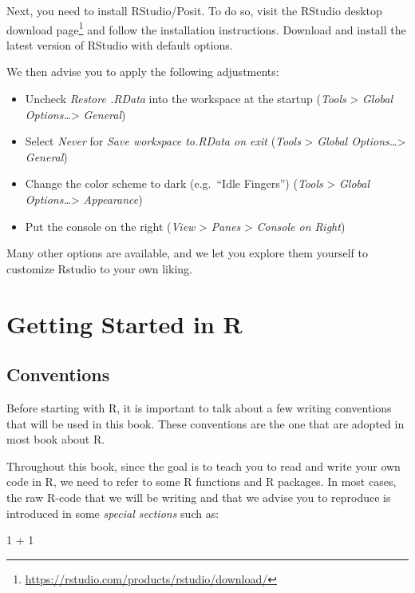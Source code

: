 \documentclass[
]{krantz}
\makeatletter
\newenvironment{Shaded}{\begin{snugshade}}{\end{snugshade}}
\newcommand{\DecValTok}[1]{\textcolor[rgb]{0.06,0.06,0.06}{#1}}
\newcommand{\SpecialCharTok}[1]{\textcolor[rgb]{0,0,0}{#1}}
\providecommand{\tightlist}{%
  \setlength{\itemsep}{0pt}\setlength{\parskip}{0pt}}
\renewcommand{\href}[2]{#2\footnote{\url{#1}}}
\newenvironment{kframe}{%
\medskip{}
\setlength{\fboxsep}{.8em}
 \def\at@end@of@kframe{}%
 \ifinner\ifhmode%
  \def\at@end@of@kframe{\end{minipage}}%
  \begin{minipage}{\columnwidth}%
 \fi\fi%
 \def\FrameCommand##1{\hskip\@totalleftmargin \hskip-\fboxsep
 \colorbox{shadecolor}{##1}\hskip-\fboxsep
     \hskip-\linewidth \hskip-\@totalleftmargin \hskip\columnwidth}%
 \MakeFramed {\advance\hsize-\width
   \@totalleftmargin\z@ \linewidth\hsize
   \@setminipage}}%
 {\par\unskip\endMakeFramed%
 \at@end@of@kframe}
\renewenvironment{Shaded}{\begin{kframe}}{\end{kframe}}
\makeatother
\begin{document}
Next, you need to install RStudio/Posit. To do so, visit the \href{https://rstudio.com/products/rstudio/download/}{RStudio desktop download page} and follow the installation instructions. Download and install the latest version of RStudio with default options.

We then advise you to apply the following adjustments:

\begin{itemize}
\tightlist
\item
  Uncheck \emph{Restore .RData} into the workspace at the startup (\emph{Tools} \textgreater{} \emph{Global Options\ldots{}}\textgreater{} \emph{General})
\item
  Select \emph{Never} for \emph{Save workspace to.RData on exit} (\emph{Tools} \textgreater{} \emph{Global Options\ldots{}}\textgreater{} \emph{General})
\item
  Change the color scheme to dark (e.g.~``Idle Fingers'') (\emph{Tools} \textgreater{} \emph{Global Options\ldots{}}\textgreater{} \emph{Appearance})
\item
  Put the console on the right (\emph{View} \textgreater{} \emph{Panes} \textgreater{} \emph{Console on Right})
\end{itemize}

Many other options are available, and we let you explore them yourself to customize Rstudio to your own liking.

\hypertarget{getting-started-in-r}{%
\section{Getting Started in R}\label{getting-started-in-r}}

\hypertarget{packages}{%
\subsection{Conventions}\label{packages}}

Before starting with R, it is important to talk about a few writing conventions that will be used in this book. These conventions are the one that are adopted in most book about R.

Throughout this book, since the goal is to teach you to read and write your own code in R, we need to refer to some R functions and R packages. In most cases, the raw R-code that we will be writing and that we advise you to reproduce is introduced in some \emph{special sections} such as:

\begin{Shaded}
\begin{Highlighting}[]
\DecValTok{1} \SpecialCharTok{+} \DecValTok{1}
\end{Highlighting}
\end{Shaded}
\end{document}
